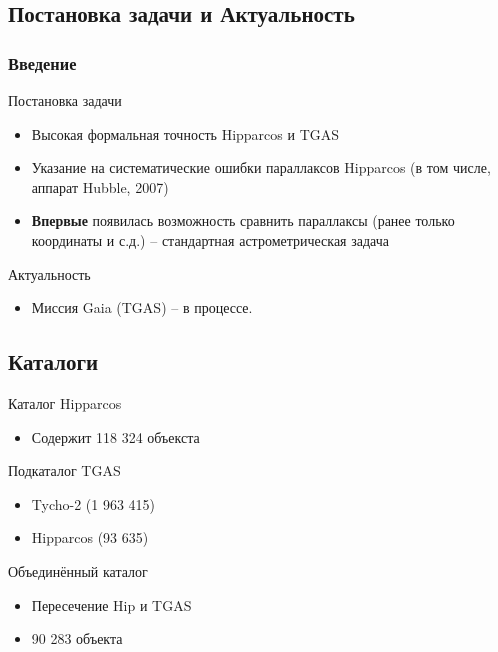 \documentclass[12pt,aspectratio=43]{beamer}
\begin{document}
 			 
 			 


\subsection{Постановка задачи и Актуальность}

\label{sub:smthgaia}
\begin{frame}\frametitle{Введение}
\begin{block}{Постановка задачи}
\begin{itemize}
  \item Высокая формальная точность Hipparcos и TGAS
  \item Указание на систематические ошибки параллаксов Hipparcos (в том числе, аппарат Hubble, 2007)
  \item \textbf{Впервые} появилась возможность сравнить параллаксы (ранее только координаты и с.д.) – стандартная астрометрическая задача
  \end{itemize}
\end{block}
\begin{block}{Актуальность}
\begin{itemize}
  \item[] Миссия Gaia (TGAS) – в процессе.
\end{itemize}
\end{block}
\end{frame}

\subsection{Каталоги}
\begin{frame}%
\begin{block}{Каталог Hipparcos}
\begin{itemize}
  \item Содержит 118 324 объекста
  \end{itemize}
\end{block}  

\begin{block}{Подкаталог TGAS}
\begin{itemize}
  \item Tycho-2 (1 963 415)
  \item Hipparcos (93 635)
  \end{itemize}
\end{block}  
\begin{block}{Объединённый каталог}
\begin{itemize}
  \item Пересечение Hip и TGAS
  \item 90 283 объекта
  \end{itemize}
\end{block}  
\end{frame}	
\end{document}
